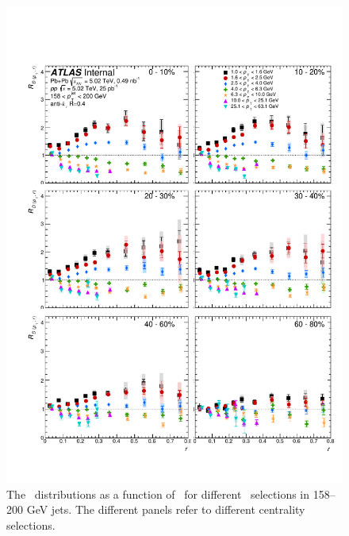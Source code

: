 \begin{figure}[h]
\includegraphics[width=1.0\textwidth]{figures/results/RDpT_dR_jet8}
\caption{The \RDptr\ distributions as a function of \rvar\ for different \pt\ selections in 158--200 GeV jets. The different panels refer to different centrality selections.}
\label{fig:fullset_rptr_j8}
\end{figure}

